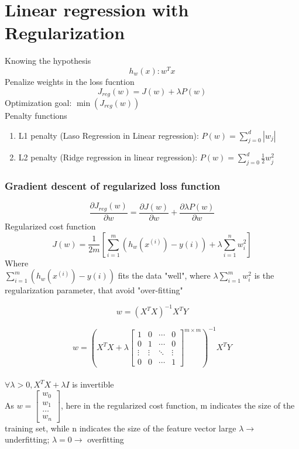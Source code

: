 \documentclass{article}
\begin{document}
\section*{Linear regression with Regularization}
Knowing the hypothesis 
\[h_w(x): w^Tx\]
Penalize weights in the loss fucntion
\[J_{reg}(w) = J(w) + \lambda P(w)\]
Optimization goal: $\min(J_{reg}(w))$\\
Penalty functions
\begin{enumerate}
    \item L1 penalty (Laso Regression in Linear regression): $P(w) = \sum_{j=0}^{d}|w_j|$
    \item L2 penalty (Ridge regression in linear regression): $P(w) = \sum_{j=0}^{d}\frac{1}{2}w^2_j$
\end{enumerate}
\subsubsection*{Gradient descent of regularized loss function}
\begin{equation}
    \frac{\partial J_{reg}(w)}{\partial w} = \frac{\partial J(w)}{\partial w} + \frac{\partial \lambda P(w)}{\partial w}
\end{equation}
Regularized cost function
\[J(w) = \frac{1}{2m}\left[\sum_{i = 1}^{m}(h_w(x^{(i)})- y{(i)}) + \lambda\sum_{i=1}^{n} w_i^2\right]\]
Where \\
$\sum_{i = 1}^{m}(h_w(x^{(i)})- y{(i)})$ fits the data "well", where
$ \lambda\sum_{i=1}^{m} w_i^2$ is the regularization parameter, that avoid "over-fitting"

\[w = (X^TX)^{-1}X^TY\]

\[w = (X^TX + \lambda \begin{bmatrix}
    1 & 0 & \cdots & 0 \\
    0 & 1 & \cdots & 0 \\
    \vdots & \vdots & \ddots & \vdots \\
    0 & 0 & \cdots  & 1
\end{bmatrix}^{m\times m}) ^{-1} X^TY\]\\
$\forall \lambda > 0, X^TX + \lambda I$ is invertible\\
As \(w = 
\begin{bmatrix}
    w_0 \\w_1 \\\dots \\w_n
\end{bmatrix}\), here in the regularized cost function, m indicates the size of the training set, while n indicates the size of the feature vector
large $\lambda \rightarrow$ underfitting; $\lambda = 0 \rightarrow$ overfitting 
\end{document}

